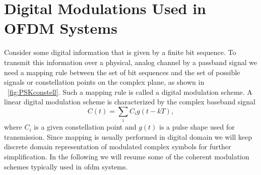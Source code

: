 \section{Digital Modulations Used in OFDM Systems}\label{sec:cohmod}
%
Consider some digital information that is given by a finite bit sequence. To transmit this information over a physical, analog channel by a passband signal we need a mapping rule between the set of bit sequences and the set of possible signals or constellation points on the complex plane, as shown in ~\cref{fig:PSKconstell}. Such a mapping rule is called a digital modulation scheme. A linear digital modulation scheme is characterized by the complex baseband signal \cite{RFSDR}
%
\begin{equation}
\label{eqn:timetime}
C(t) = \sum_iC_ig(t-kT),
\end{equation}
%
where $C_i$ is a given constellation point and $g(t)$ is a pulse shape used for transmission.
Since mapping is usually performed in digital domain we will keep discrete domain representation of modulated complex symbols for further simplification. In the following we will resume some of the coherent modulation schemes typically used in \gls{ofdm} systems.



